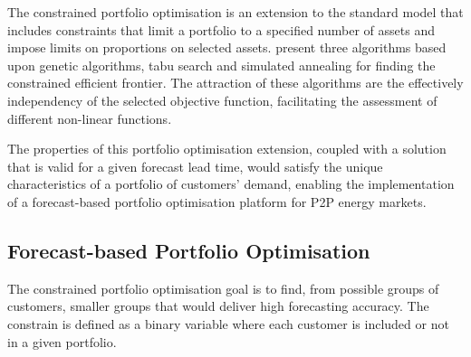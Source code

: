 \documentclass[preprint,3p,11pt,authoryear]{elsarticle}
\begin{document}
The constrained portfolio optimisation is an extension to the standard model that includes constraints that limit a portfolio to a specified number of assets and impose limits on proportions on selected assets.
\citet{CHANG20001271} present three algorithms based upon genetic algorithms, tabu search and simulated annealing for finding the constrained efficient frontier.
The attraction of these algorithms are the effectively independency of the selected objective function, facilitating the assessment of different non-linear functions.

The properties of this portfolio optimisation extension, coupled with a solution that is valid for a given forecast lead time, would satisfy the unique characteristics of a portfolio of customers' demand, enabling the implementation of a forecast-based portfolio optimisation platform for P2P energy markets.

\subsection{Forecast-based Portfolio Optimisation}
\label{ss:portopt}

The constrained portfolio optimisation goal is to find, from possible groups of customers, smaller groups that would deliver high forecasting accuracy.
The constrain is defined as a binary variable where each customer is included or not in a given portfolio.
\end{document}

